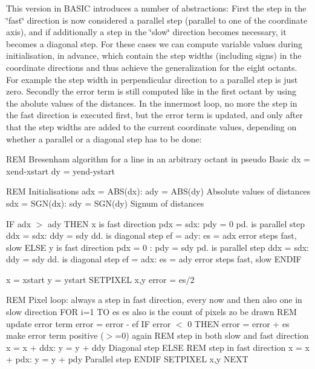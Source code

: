 This version in B\+A\+S\+IC introduces a number of abstractions\+: First the step in the \char`\"{}fast\char`\"{} direction is now considered a parallel step (parallel to one of the coordinate axis), and if additionally a step in the \char`\"{}slow\char`\"{} direction becomes necessary, it becomes a diagonal step. For these cases we can compute variable values during initialisation, in advance, which contain the step widths (including signs) in the coordinate directions and thus achieve the generalization for the eight octants. For example the step width in perpendicular direction to a parallel step is just zero. Secondly the error term is still computed like in the first octant by using the abolute values of the distances. In the innermost loop, no more the step in the fast direction is executed first, but the error term is updated, and only after that the step widths are added to the current coordinate values, depending on whether a parallel or a diagonal step has to be done\+:

R\+EM Bresenham algorithm for a line in an arbitrary octant in pseudo Basic dx = xend-\/xstart dy = yend-\/ystart

R\+EM Initialisations adx = A\+B\+S(dx)\+: ady = A\+B\+S(dy) \textquotesingle{} Absolute values of distances sdx = S\+G\+N(dx)\+: sdy = S\+G\+N(dy) \textquotesingle{} Signum of distances

IF adx $>$ ady T\+H\+EN \textquotesingle{} x is fast direction pdx = sdx\+: pdy = 0 \textquotesingle{} pd. is parallel step ddx = sdx\+: ddy = sdy \textquotesingle{} dd. is diagonal step ef = ady\+: es = adx \textquotesingle{} error steps fast, slow E\+L\+SE \textquotesingle{} y is fast direction pdx = 0 \+: pdy = sdy \textquotesingle{} pd. is parallel step ddx = sdx\+: ddy = sdy \textquotesingle{} dd. is diagonal step ef = adx\+: es = ady \textquotesingle{} error steps fast, slow E\+N\+D\+IF

x = xstart y = ystart S\+E\+T\+P\+I\+X\+EL x,y error = es/2

R\+EM Pixel loop\+: always a step in fast direction, every now and then also one in slow direction F\+OR i=1 TO es \textquotesingle{} es also is the count of pixels zo be drawn R\+EM update error term error = error -\/ ef IF error $<$ 0 T\+H\+EN error = error + es \textquotesingle{} make error term positive ($>$=0) again R\+EM step in both slow and fast direction x = x + ddx\+: y = y + ddy \textquotesingle{} Diagonal step E\+L\+SE R\+EM step in fast direction x = x + pdx\+: y = y + pdy \textquotesingle{} Parallel step E\+N\+D\+IF S\+E\+T\+P\+I\+X\+EL x,y N\+E\+XT

